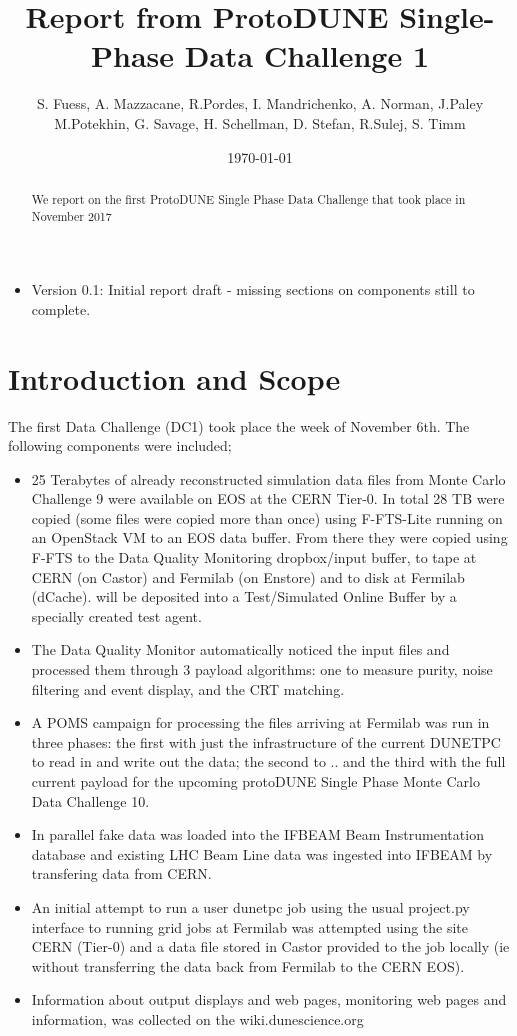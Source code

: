 \documentclass[pdftex,12pt,letter]{article}
\title{Report from ProtoDUNE Single-Phase Data Challenge 1}
\date{\today}
\author{S. Fuess, A. Mazzacane, R.Pordes, I. Mandrichenko, A. Norman, J.Paley \\
M.Potekhin, G. Savage, H. Schellman, D. Stefan, R.Sulej, S. Timm}
\begin{document}
\maketitle
\begin{abstract}
\noindent We report on the first ProtoDUNE Single Phase Data Challenge that took place in November 2017
\end{abstract}


\begin{itemize}
\item Version 0.1: Initial report draft - missing sections on components still to complete.
\clearpage
\end{itemize}

\tableofcontents
\pagebreak



\section{Introduction and Scope}

The first Data Challenge  (DC1) took place the week of November 6th. The following components were included; 



\begin{itemize}
\item 25 Terabytes of already reconstructed simulation data files from Monte Carlo Challenge 9 were available on EOS at the CERN Tier-0. In total 28 TB  were copied (some files were copied more than once) using F-FTS-Lite running on an OpenStack VM to an EOS data buffer. From there they were copied using F-FTS to the Data Quality Monitoring dropbox/input buffer, to tape at CERN (on Castor) and Fermilab (on Enstore) and to disk at Fermilab (dCache). 
will be deposited into a Test/Simulated Online Buffer by a specially created test agent.
\item  The Data Quality Monitor automatically noticed the input files and processed them through 3 payload algorithms: one to measure purity, noise filtering and event display, and the CRT matching. 
\item A POMS campaign for processing the files arriving at Fermilab was run in three phases: the first with just the infrastructure of the current DUNETPC to read in and write out the data; the second to .. and the third with the full current payload for the upcoming protoDUNE Single Phase Monte Carlo Data Challenge 10. 
\item In parallel fake data was loaded into the IFBEAM Beam Instrumentation database and existing LHC Beam Line data was ingested into IFBEAM by transfering data from CERN. 
\item An initial attempt to run a user dunetpc job using the  usual project.py interface to running grid jobs at Fermilab was attempted using the site CERN (Tier-0) and a data file stored in Castor provided to the job locally (ie without transferring the data back from Fermilab to the CERN EOS). 
\item Information about output displays and web pages, monitoring web pages and information, was collected on the wiki.dunescience.org
\end{itemize}
\end{document}

